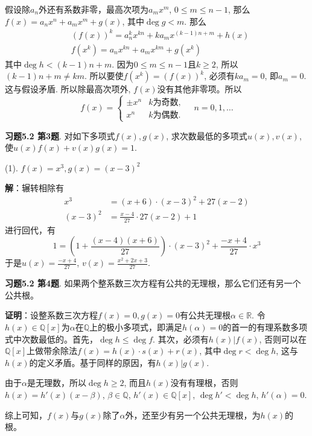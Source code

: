 假设除$a_n$外还有系数非零，最高次项为$a_mx^m$, $0 \leqslant m \leqslant n-1$, 那么$f(x) = a_nx^n + a_mx^m + g(x)$, 其中$\deg g < m$. 那么
\begin{align*}
& (f(x))^k = a_n^kx^{kn} + ka_mx^{(k-1)n+m} + h(x) \\
& f(x^k) = a_nx^{kn} + a_mx^{km} + g(x^k)
\end{align*}
其中$\deg h < (k-1)n+m$. 因为$0 \leqslant m \leqslant n-1$且$k\geqslant 2$, 所以$(k-1)n+m \neq km$. 所以要使$f(x^k) = (f(x))^k$, 必须有$ka_m = 0$, 即$a_m = 0$. 这与假设矛盾. 所以除最高次项外, $f(x)$没有其他非零项。所以
$$f(x) = \begin{cases}\pm x^n & \text{$k$为奇数}, \\ x^n & \text{$k$为偶数}. \end{cases} \quad n = 0, 1, \ldots$$

\newpageorvspace


{\bf 习题5.2 第3题}. 对如下多项式$f(x), g(x)$, 求次数最低的多项式$u(x), v(x)$, 使$u(x)f(x) + v(x)g(x) = 1$.

(1). $f(x) = x^3, g(x) = (x-3)^2$

{\bf 解}：辗转相除有
\begin{align*}
x^3 & = (x+6) \cdot (x-3)^2 + 27(x-2) \\
(x-3)^2 & = \frac{x-4}{27} \cdot 27(x-2) + 1
\end{align*}
进行回代，有
$$1 = \left( 1 + \frac{(x-4)(x+6)}{27} \right) \cdot (x-3)^2 + \frac{-x+4}{27} \cdot x^3$$
于是$u(x) = \frac{-x+4}{27}$, $v(x) = \frac{x^2+2x+3}{27}$.

\newpageorvspace


{\bf 习题5.2 第4题}. 如果两个整系数三次方程有公共的无理根，那么它们还有另一个公共根。

{\bf 证明}：设整系数三次方程$f(x) = 0, g(x) = 0$有公共无理根$\alpha\in\mathbb{R}$. 令$h(x)\in\mathbb{Q}[x]$为$\alpha$在$\mathbb{Q}$上的极小多项式，即满足$h(\alpha) = 0$的首一的有理系数多项式中次数最低的。首先，$\deg h \leqslant \deg f$. 其次，必须有$h(x)|f(x)$, 否则可以在$\mathbb{Q}[x]$上做带余除法$f(x) = h(x)\cdot s(x) + r(x)$, 其中$\deg r < \deg h$, 这与$h(x)$的定义矛盾。基于同样的原因，有$h(x)|g(x)$.

由于$\alpha$是无理数，所以$\deg h \geqslant 2$, 而且$h(x)$没有有理根，否则$h(x) = h'(x)(x-\beta)$, $\beta\in\mathbb{Q}$, $h'(x)\in\mathbb{Q}[x]$, $\deg h' < \deg h$, $h'(\alpha) = 0$.

综上可知，$f(x)$与$g(x)$除了$\alpha$外，还至少有另一个公共无理根，为$h(x)$的根。

